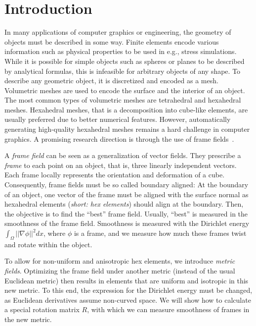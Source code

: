 \documentclass[../thesis.tex]{subfiles}
\begin{document}
\chapter{Introduction}
\label{ch:intro}
In many applications of computer graphics or engineering, the geometry of objects
must be described in some way. Finite elements encode various information such as physical properties
to be used in e.g., stress simulations.
While it is possible for simple objects such as spheres or planes to be described by
analytical formulas, this is infeasible for arbitrary objects of any shape.
To describe any geometric object, it is discretized and encoded as a mesh.
Volumetric meshes are used to encode the surface and the interior of an object.
The most common types of volumetric meshes are tetrahedral and hexahedral meshes.
Hexahedral meshes, that is a decomposition into cube-like elements,
are usually preferred due to better numerical features.
However, automatically generating high-quality hexahedral meshes remains a hard challenge
in computer graphics.
A promising research direction is through the use of frame fields~\cite{Hex22}.

A \emph{frame field} can be seen as a generalization of vector fields.
They prescribe a \emph{frame} to each point on an object, that is, three linearly independent
vectors. Each frame locally represents the orientation and deformation of a cube.
Consequently, frame fields must be so called boundary aligned:
At the boundary of an object, one vector of the frame must be aligned with the surface normal
as hexahedral elements (\emph{short: hex elements}) should align at the boundary.
Then, the objective is to find the ``best'' frame field.
Usually, ``best'' is measured in the smoothness of the frame field.
Smoothness is measured with the Dirichlet energy $\int_{\Omega}||\nabla \phi||^2dx$,
where $\phi$ is a frame, and we measure how much these frames twist and rotate within the object.

To allow for non-uniform and anisotropic hex elements, we introduce
\emph{metric fields}. Optimizing the frame field under another metric (instead of the usual Euclidean metric) then results
in elements that are uniform and isotropic in this new metric.
To this end, the expression for the Dirichlet energy must be changed, as Euclidean derivatives
assume non-curved space.
We will show how to calculate a special rotation matrix $R$, with which we can measure
smoothness of frames in the new metric.
\end{document}
